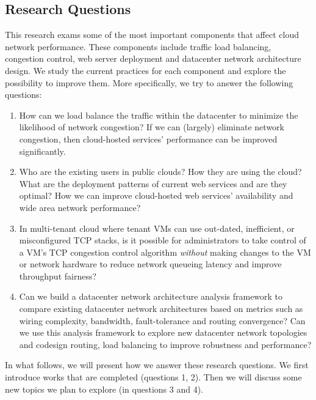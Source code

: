 \subsection{Research Questions}

This research exams some of the most important components that affect cloud network performance. 
These components include traffic load balancing, congestion control, web server deployment
and datacenter network architecture design.
We study the current practices for each component
and explore the possibility to improve them.
More specifically, we try to answer the following questions:

\begin{enumerate}

\item How can we load balance the traffic within the datacenter to 
minimize the likelihood of network congestion? 
If we can (largely) eliminate network congestion, 
then cloud-hosted services' performance can be improved significantly. 

\item Who are the existing users in public clouds? 
How they are using the cloud? 
What are the deployment patterns of current web services and are they optimal?
How we can improve cloud-hosted web services' 
availability and wide area network performance?

\item In multi-tenant cloud where tenant VMs can use out-dated, inefficient, or
misconfigured TCP stacks, is it possible for administrators to 
take control of a VM's TCP congestion control
algorithm {\em without} making changes to the VM or network hardware to 
reduce network queueing latency and improve throughput fairness?

\item Can we build a datacenter network architecture analysis framework to 
compare existing datacenter network architectures 
based on metrics such as wiring complexity, bandwidth, fault-tolerance and routing convergence? 
Can we use this analysis framework to explore new datacenter network topologies and 
codesign routing, load balancing to improve robustness and performance?

\end{enumerate}

In what follows, we will present how we answer these research questions. 
We first introduce works that are completed (questions 1, 2). 
Then we will discuss some new topics we plan to explore (in questions 3 and 4).

